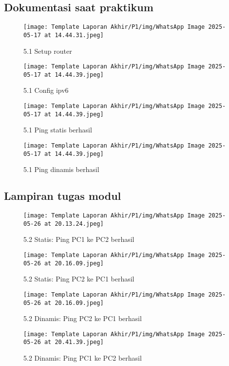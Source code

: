 \subsection{Dokumentasi saat praktikum}
\begin{figure}
    \centering
    \texttt{[image: Template Laporan Akhir/P1/img/WhatsApp Image 2025-05-17 at 14.44.31.jpeg]}
    \caption{5.1 Setup router}
    \label{fig:enter-label}
\end{figure}
\begin{figure}
    \centering
    \texttt{[image: Template Laporan Akhir/P1/img/WhatsApp Image 2025-05-17 at 14.44.39.jpeg]}
    \caption{5.1 Config ipv6}
    \label{fig:enter-label}
\end{figure}
\begin{figure}
    \centering
    \texttt{[image: Template Laporan Akhir/P1/img/WhatsApp Image 2025-05-17 at 14.44.39.jpeg]}
    \caption{5.1 Ping statis berhasil}
    \label{fig:enter-label}
\end{figure}
\begin{figure}
    \centering
    \texttt{[image: Template Laporan Akhir/P1/img/WhatsApp Image 2025-05-17 at 14.44.39.jpeg]}
    \caption{5.1 Ping dinamis berhasil}
    \label{fig:enter-label}
\end{figure}
\subsection{Lampiran tugas modul}
\begin{figure}
    \centering
    \texttt{[image: Template Laporan Akhir/P1/img/WhatsApp Image 2025-05-26 at 20.13.24.jpeg]}
    \caption{5.2 Statis: Ping PC1 ke PC2 berhasil}
    \label{fig:enter-label}
\end{figure}
\begin{figure}
    \centering
    \texttt{[image: Template Laporan Akhir/P1/img/WhatsApp Image 2025-05-26 at 20.16.09.jpeg]}
    \caption{5.2 Statis: Ping PC2 ke PC1 berhasil}
    \label{fig:enter-label}
\end{figure}
\begin{figure}
    \centering
    \texttt{[image: Template Laporan Akhir/P1/img/WhatsApp Image 2025-05-26 at 20.16.09.jpeg]}
    \caption{5.2 Dinamis: Ping PC2 ke PC1 berhasil}
    \label{fig:enter-label}
\end{figure}
\begin{figure}
    \centering
    \texttt{[image: Template Laporan Akhir/P1/img/WhatsApp Image 2025-05-26 at 20.41.39.jpeg]}
    \caption{5.2 Dinamis: Ping PC1 ke PC2 berhasil}
    \label{fig:enter-label}
\end{figure}